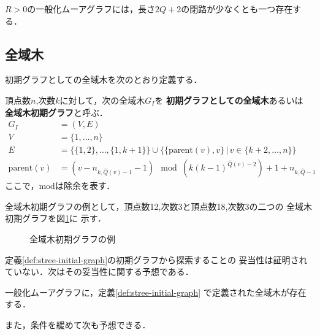 \begin{conjecture}\rm
  \label{conj:gmg-cycle}
  $R>0$の一般化ムーアグラフには，長さ$2Q+2$の閉路が少なくとも一つ存在する．
\end{conjecture}

\subsection{全域木}
\label{subsect:initial-spanning-tree}
初期グラフとしての全域木を次のとおり定義する．
\begin{definition}\rm
  \label{def:stree-initial-graph}
  頂点数$n$,次数$k$に対して，次の全域木$G_I$を
  \textbf{初期グラフとしての全域木}あるいは
  \textbf{全域木初期グラフ}と呼ぶ．
  \begin{equation}
    \begin{aligned}
      G_I&=(V,E) \\
      V&=\{1,\ldots,n\} \\
      E&=\{\{1,2\},\ldots,\{1,k+1\}\}\cup
      \{\{\text{parent}(v),v\}\,|\,v\in \{k+2,\ldots,n\}\}  \\
      \text{parent}(v)&=
      (v-n_{k,\hat{Q}(v)-1}-1)\mod(k(k-1)^{\hat{Q}(v)-2})+1+n_{k,\hat{Q}-1}
    \end{aligned}
  \end{equation}
  ここで，$\text{mod}$は除余を表す．
\end{definition}

全域木初期グラフの例として，頂点数12,次数3と頂点数18,次数3の二つの
全域木初期グラフを図\ref{fig:initial-spanning-tree-example}に
示す．

\begin{figure}
  \centering
  \hfill
  \caption{全域木初期グラフの例}
  \label{fig:initial-spanning-tree-example}
\end{figure}

定義\ref{def:stree-initial-graph}の初期グラフから探索することの
妥当性は証明されていない．次はその妥当性に関する予想である．
\begin{conjecture}\rm
  \label{conj:spanning-tree}
  一般化ムーアグラフに，定義\ref{def:stree-initial-graph}
  で定義された全域木が存在する．
\end{conjecture}

また，条件を緩めて次も予想できる．

